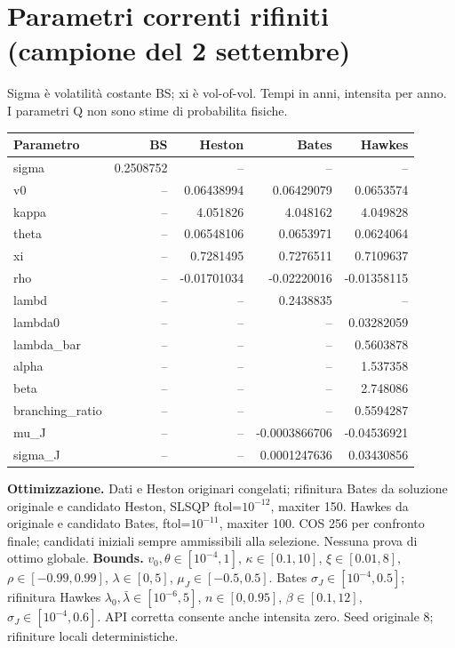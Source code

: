 \documentclass[10pt,a4paper]{article}
\begin{document}
\section{Parametri correnti rifiniti (campione del 2 settembre)}
Sigma è volatilità costante BS; xi è vol-of-vol. Tempi in anni, intensita per anno. I parametri Q non sono stime di probabilita fisiche.
\begin{center}\small\begin{tabular}{lrrrr}\toprule
Parametro & BS & Heston & Bates & Hawkes\\\midrule
sigma & 0.2508752 & -- & -- & -- \\
v0 & -- & 0.06438994 & 0.06429079 & 0.0653574 \\
kappa & -- & 4.051826 & 4.048162 & 4.049828 \\
theta & -- & 0.06548106 & 0.0653971 & 0.0624064 \\
xi & -- & 0.7281495 & 0.7276511 & 0.7109637 \\
rho & -- & -0.01701034 & -0.02220016 & -0.01358115 \\
lambd & -- & -- & 0.2438835 & -- \\
lambda0 & -- & -- & -- & 0.03282059 \\
lambda\_bar & -- & -- & -- & 0.5603878 \\
alpha & -- & -- & -- & 1.537358 \\
beta & -- & -- & -- & 2.748086 \\
branching\_ratio & -- & -- & -- & 0.5594287 \\
mu\_J & -- & -- & -0.0003866706 & -0.04536921 \\
sigma\_J & -- & -- & 0.0001247636 & 0.03430856 \\
\bottomrule\end{tabular}\end{center}
\textbf{Ottimizzazione.} Dati e Heston originari congelati; rifinitura Bates da soluzione originale e candidato Heston, SLSQP ftol=$10^{-12}$, maxiter 150. Hawkes da originale e candidato Bates, ftol=$10^{-11}$, maxiter 100. COS 256 per confronto finale; candidati iniziali sempre ammissibili alla selezione. Nessuna prova di ottimo globale.
\textbf{Bounds.} $v_0,\theta\in[10^{-4},1]$, $\kappa\in[0.1,10]$, $\xi\in[0.01,8]$, $\rho\in[-0.99,0.99]$, $\lambda\in[0,5]$, $\mu_J\in[-0.5,0.5]$. Bates $\sigma_J\in[10^{-4},0.5]$; rifinitura Hawkes $\lambda_0,\bar\lambda\in[10^{-6},5]$, $n\in[0,0.95]$, $\beta\in[0.1,12]$, $\sigma_J\in[10^{-4},0.6]$. API corretta consente anche intensita zero. Seed originale 8; rifiniture locali deterministiche.
\end{document}
